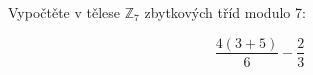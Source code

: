 \subsubsection{}
Vypočtěte v tělese $\mathbb{Z}_{7}$ zbytkových tříd modulo 7:

$$\frac{4(3+5)}{6}-\frac{2}{3}$$
